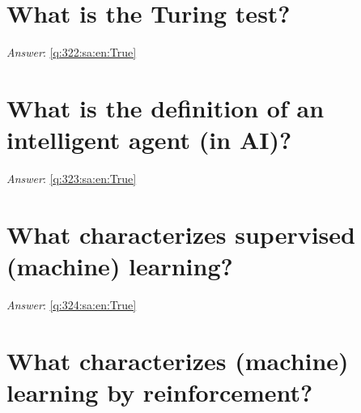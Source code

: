 \documentclass[a4paper,11pt,oneside]{book}
\begin{document}
\begin{sloppypar}
\section{What is the Turing test?}

\label{q:322:sa:en:False}

\vspace{2cm}

\noindent\makebox[\textwidth]{\hrulefill}

\vspace{1cm}

\textit{Answer}: \autoref{q:322:sa:en:True}



\section{What is the definition of an intelligent agent (in AI)?}

\label{q:323:sa:en:False}

\vspace{2cm}

\noindent\makebox[\textwidth]{\hrulefill}

\vspace{1cm}

\textit{Answer}: \autoref{q:323:sa:en:True}



\section{What characterizes supervised (machine) learning?}

\label{q:324:sa:en:False}

\vspace{2cm}

\noindent\makebox[\textwidth]{\hrulefill}

\vspace{1cm}

\textit{Answer}: \autoref{q:324:sa:en:True}



\section{What characterizes (machine) learning by reinforcement?}

\label{q:325:sa:en:False}

\vspace{2cm}

\noindent\makebox[\textwidth]{\hrulefill}


\end{sloppypar}
\end{document}

